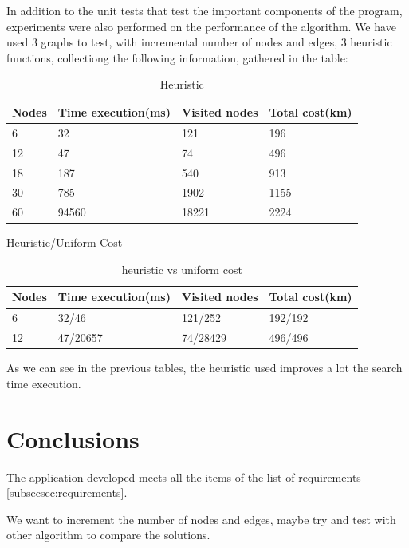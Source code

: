 \documentclass[a4paper]{article}
\begin{document}
In addition to the unit tests that test the important components of the program, experiments were also performed on the performance of the algorithm. We have used 3 graphs to test, with incremental number of nodes and edges, 3 heuristic functions, collectiong the following information, gathered in the table:

\begin{table}[H]
	\centering
	\label{heuristic1}
	\begin{tabular}{ | m{1.5cm} | m{3cm} | m{2cm} | m{2.5cm} |  }
		\hline
		\centering \textbf{Nodes} &	\textbf{Time execution(ms)} & \textbf{Visited nodes} & \textbf{Total cost(km)} \\[2ex] \hline
		6  &	32 	& 121 	& 196	\\[2ex] \hline
		12 & 	47 	& 74 	& 496 \\[2ex] \hline
		18 &	187 & 540 	& 913 \\[2ex] \hline
		30 &	785 & 1902 	& 1155 \\[2ex] \hline
		60 & 94560 	& 18221 	& 2224 \\[2ex] \hline		
	\end{tabular}\caption{Heuristic}
\end{table}

Heuristic/Uniform Cost
\begin{table}[H]
	\centering
	\label{heuristicvs0}
	\begin{tabular}{ | m{1.5cm} | m{3cm} | m{2cm} | m{2.5cm} |  }
		\hline
		\centering \textbf{Nodes} &	\textbf{Time execution(ms)} & \textbf{Visited nodes} & \textbf{Total cost(km)} \\[2ex] \hline
		6 	&	32/46 	& 121/252 	& 192/192 \\[2ex] \hline
		12 	&	47/20657 & 74/28429 & 496/496 \\[2ex] \hline
	\end{tabular}\caption{heuristic vs uniform cost}
\end{table}

As we can see in the previous tables, the heuristic used improves a lot the search time execution.

\section{Conclusions} 

The application developed meets all the items of the list of requirements \ref{subsecsec:requirements}. 

We want to increment the number of nodes and edges, maybe try and test with other algorithm to compare the solutions. 
\end{document}
